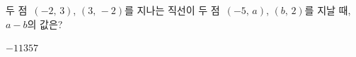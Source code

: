 두 점~$(-2,\,3)$, $(3,\,-2)$를 지나는 직선이 두 점~$(-5,\,a)$, $(b,\,2)$를 지날 때, $a-b$의 값은?
\begin{choices32}{$-1$}{$1$}{$3$}{$5$}{$7$}\end{choices32}
